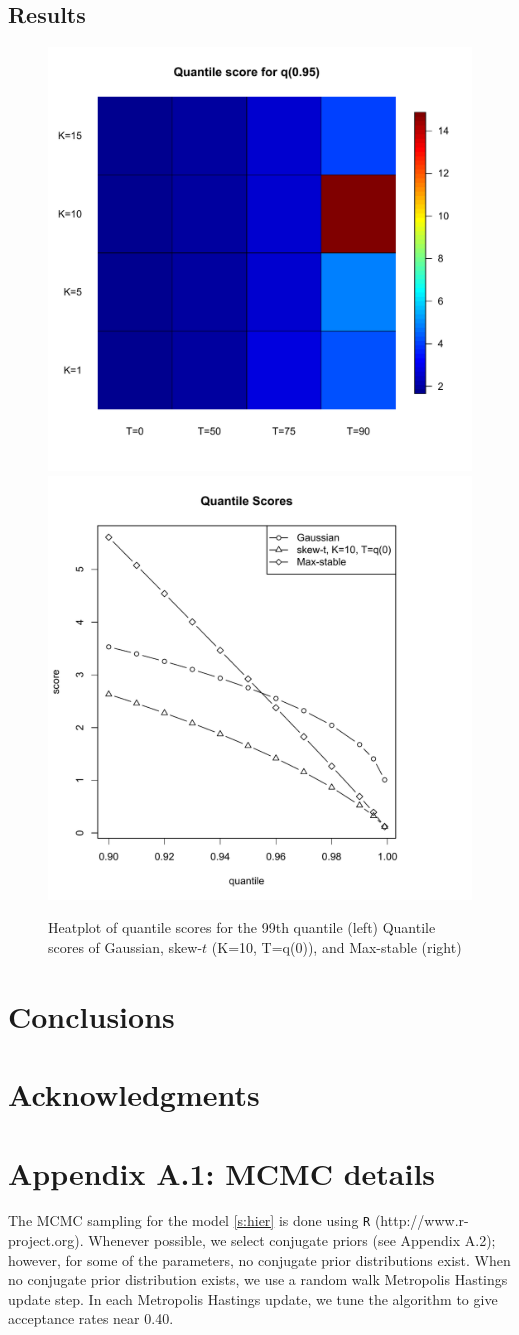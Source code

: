 \documentclass[11pt]{article}
\begin{document}
\subsection{Results}\label{s:results}
\begin{figure}
  \includegraphics[width=0.5\linewidth]{plots/heatplot.pdf}
  \includegraphics[width=0.5\linewidth]{plots/qscore-best.pdf}
  \caption{Heatplot of quantile scores for the 99th quantile (left) Quantile scores of Gaussian, skew-$t$ (K=10, T=q(0)), and Max-stable (right)}
  \label{fig:heatplot}
\end{figure}

\section{Conclusions}\label{s:con}

\section*{Acknowledgments}

\section*{Appendix A.1: MCMC details}
The MCMC sampling for the model \ref{s:hier} is done using {\tt R} (http://www.r-project.org). Whenever possible, we select conjugate priors (see Appendix A.2); however, for some of the parameters, no conjugate prior distributions exist.
When no conjugate prior distribution exists, we use a random walk Metropolis Hastings update step.
In each Metropolis Hastings update, we tune the algorithm to give acceptance rates near 0.40.
\end{document}
